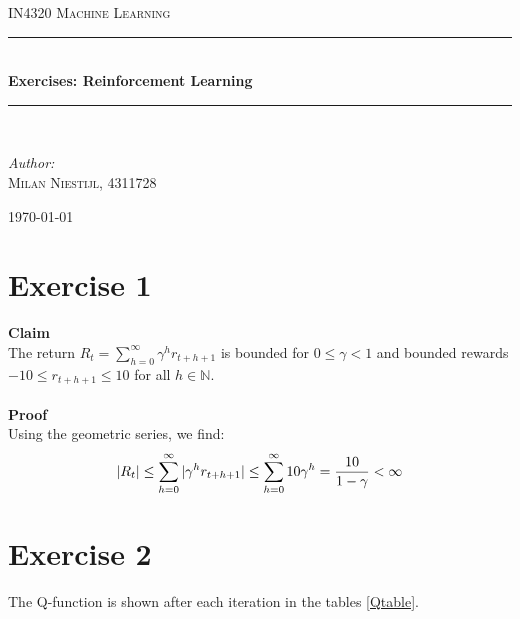 \documentclass [a4paper] {report}
\begin{document}
	
	\begin{titlepage}
		\begin{center}
			
			\textsc{\LARGE IN4320 Machine Learning}\\[1.25cm]
			
			\rule{\linewidth}{0.5mm}\\[1.0cm]
			{\huge \bfseries Exercises: Reinforcement Learning }\\[0.6cm]
			\rule{\linewidth}{0.5mm}\\[1.5cm]
			
			\begin{minipage}{0.4\textwidth}
				\begin{flushleft} \large	
					\emph{Author:}\\
					\textsc{Milan Niestijl, 4311728}
				\end{flushleft}
			\end{minipage}
			
			\vfill
			{\large \today}
		\end{center}
	\end{titlepage}
	
	\section*{Exercise 1}
	\textbf{Claim}\\
	The return $R_{t} = \sum_{h=0}^{\infty}\gamma^{h}r_{t+h+1}$ is bounded for $0\leq \gamma<1$ and bounded rewards $-10\leq r_{t+h+1}\leq 10$ for all $h\in \mathbb{N}$.\\\\
	\textbf{Proof}\\
	Using the geometric series, we find:
	$$|R_{t}| \leq \sum_{h=0}^{\infty}|\gamma^{h}r_{t+h+1}| \leq \sum_{h=0}^{\infty}10 \gamma^{h} = {10 \over 1-\gamma} < \infty$$
	
	\section*{Exercise 2}
	The Q-function is shown after each iteration in the tables \ref{Qtable}.
	
\end{document}
